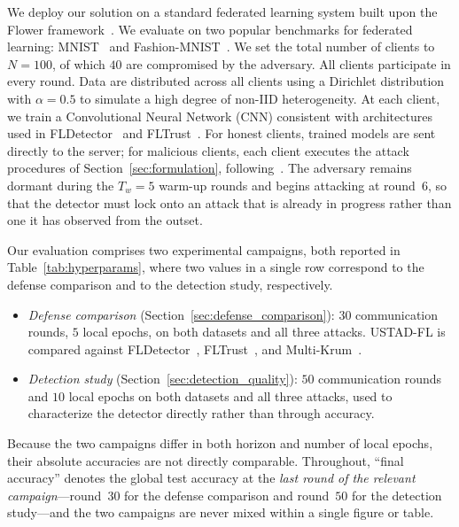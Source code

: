 \documentclass[journal]{IEEEtran}
\begin{document}
We deploy our solution on a standard federated learning system built upon the Flower framework~\cite{beutel2020flower}. We evaluate on two popular benchmarks for federated learning: MNIST~\cite{lecun1998mnist} and Fashion-MNIST~\cite{xiao2017fashion}. We set the total number of clients to $N = 100$, of which $40$ are compromised by the adversary. All clients participate in every round. Data are distributed across all clients using a Dirichlet distribution with $\alpha = 0.5$ to simulate a high degree of non-IID heterogeneity. At each client, we train a Convolutional Neural Network (CNN) consistent with architectures used in FLDetector~\cite{zhang2022fldetector} and FLTrust~\cite{cao2020fltrust}. For honest clients, trained models are sent directly to the server; for malicious clients, each client executes the attack procedures of Section~\ref{sec:formulation}, following~\cite{baruch2019little, shejwalkar2021manipulating}. The adversary remains dormant during the $T_w = 5$ warm-up rounds and begins attacking at round~$6$, so that the detector must lock onto an attack that is already in progress rather than one it has observed from the outset.

Our evaluation comprises two experimental campaigns, both reported in Table~\ref{tab:hyperparams}, where two values in a single row correspond to the defense comparison and to the detection study, respectively.
\begin{itemize}
    \item \emph{Defense comparison} (Section~\ref{sec:defense_comparison}): $30$ communication rounds, $5$ local epochs, on both datasets and all three attacks. USTAD-FL is compared against FLDetector~\cite{zhang2022fldetector}, FLTrust~\cite{cao2020fltrust}, and Multi-Krum~\cite{blanchard2017machine}.
    \item \emph{Detection study} (Section~\ref{sec:detection_quality}): $50$ communication rounds and $10$ local epochs on both datasets and all three attacks, used to characterize the detector directly rather than through accuracy.
\end{itemize}

Because the two campaigns differ in both horizon and number of local epochs, their absolute accuracies are not directly comparable. Throughout, ``final accuracy'' denotes the global test accuracy at the \emph{last round of the relevant campaign}---round~$30$ for the defense comparison and round~$50$ for the detection study---and the two campaigns are never mixed within a single figure or table.
\end{document}
